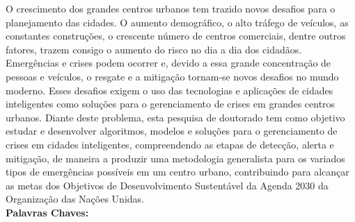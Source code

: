 \begin{thesisresumo}

O crescimento dos grandes centros urbanos tem trazido novos desafios para o planejamento das cidades. O aumento demográfico, o alto tráfego de veículos, as constantes construções, o crescente número de centros comerciais, dentre outros fatores, trazem consigo o aumento do risco no dia a dia dos cidadãos. Emergências e crises podem ocorrer e, devido a essa grande concentração de pessoas e veículos, o resgate e a mitigação tornam-se novos desafios no mundo moderno. Esses desafios exigem o uso das tecnologias e aplicações de cidades inteligentes como soluções para o gerenciamento de crises em grandes centros urbanos. Diante deste problema, esta pesquisa de doutorado tem como objetivo estudar e desenvolver algoritmos, modelos e soluções para o gerenciamento de crises em cidades inteligentes, compreendendo as etapas de detecção, alerta e mitigação, de maneira a produzir uma metodologia generalista para os variados tipos de emergências possíveis em um centro urbano, contribuindo para alcançar as metas dos Objetivos de Desenvolvimento Sustentável da Agenda 2030 da Organização das Nações Unidas.\\

\textbf{Palavras Chaves:} \ppgmpalavraschave

\end{thesisresumo}
